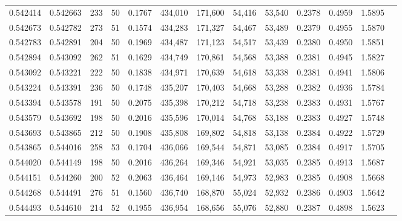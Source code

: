 \begin{tabular}{rrrrrrrrrrrrr}
0.542414 & 0.542663 &   233 &  50 &                                     0.1767 & 434,010 & 171,600 &  54,416 &  53,540 & 0.2378 & 0.4959 & 1.5895 \\
0.542673 & 0.542782 &   273 &  51 &                                     0.1574 & 434,283 & 171,327 &  54,467 &  53,489 & 0.2379 & 0.4955 & 1.5870 \\
0.542783 & 0.542891 &   204 &  50 &                                     0.1969 & 434,487 & 171,123 &  54,517 &  53,439 & 0.2380 & 0.4950 & 1.5851 \\
0.542894 & 0.543092 &   262 &  51 &                                     0.1629 & 434,749 & 170,861 &  54,568 &  53,388 & 0.2381 & 0.4945 & 1.5827 \\
0.543092 & 0.543221 &   222 &  50 &                                     0.1838 & 434,971 & 170,639 &  54,618 &  53,338 & 0.2381 & 0.4941 & 1.5806 \\
0.543224 & 0.543391 &   236 &  50 &                                     0.1748 & 435,207 & 170,403 &  54,668 &  53,288 & 0.2382 & 0.4936 & 1.5784 \\
0.543394 & 0.543578 &   191 &  50 &                                     0.2075 & 435,398 & 170,212 &  54,718 &  53,238 & 0.2383 & 0.4931 & 1.5767 \\
0.543579 & 0.543692 &   198 &  50 &                                     0.2016 & 435,596 & 170,014 &  54,768 &  53,188 & 0.2383 & 0.4927 & 1.5748 \\
0.543693 & 0.543865 &   212 &  50 &                                     0.1908 & 435,808 & 169,802 &  54,818 &  53,138 & 0.2384 & 0.4922 & 1.5729 \\
0.543865 & 0.544016 &   258 &  53 &                                     0.1704 & 436,066 & 169,544 &  54,871 &  53,085 & 0.2384 & 0.4917 & 1.5705 \\
0.544020 & 0.544149 &   198 &  50 &                                     0.2016 & 436,264 & 169,346 &  54,921 &  53,035 & 0.2385 & 0.4913 & 1.5687 \\
0.544151 & 0.544260 &   200 &  52 &                                     0.2063 & 436,464 & 169,146 &  54,973 &  52,983 & 0.2385 & 0.4908 & 1.5668 \\
0.544268 & 0.544491 &   276 &  51 &                                     0.1560 & 436,740 & 168,870 &  55,024 &  52,932 & 0.2386 & 0.4903 & 1.5642 \\
0.544493 & 0.544610 &   214 &  52 &                                     0.1955 & 436,954 & 168,656 &  55,076 &  52,880 & 0.2387 & 0.4898 & 1.5623 \\

\end{tabular}
